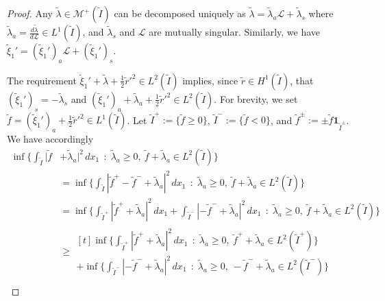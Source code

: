 \documentclass[a4, 11pt, reqno, final]{amsart}
\newcommand{\calL}{\mathcal{L}}
\newcommand{\calM}{\mathcal{M}}
\theoremstyle{plain}%
\DeclareMathOperator{\st}{\,:\,}
\begin{document}
	\begin{proof}
		Any $\widetilde{\lambda} \in \calM^+(\widetilde{I})$ can be decomposed uniquely as $\widetilde{\lambda} =  \widetilde{\lambda}_{a} \calL+ \widetilde{\lambda}_s$ where $\widetilde{\lambda}_{a} = \frac{d \widetilde{\lambda}}{d\calL}\in L^1(\widetilde{I})$, and $\widetilde{\lambda}_s$ and $\calL$ are mutually singular. Similarly, we have $\widetilde{\xi}_1' =  (\widetilde{\xi}_1')_a \calL+ (\widetilde{\xi}_1')_s$.

		The requirement $\widetilde{\xi}_1' + \widetilde{\lambda} + \frac12 \widetilde{r}'^2\in L^2(\widetilde{I})$ implies, since $\widetilde{r} \in H^1(\widetilde{I})$, that $(\widetilde{\xi}_1')_s = - \widetilde{\lambda}_s$ and
		$(\widetilde{\xi}_1')_a + \widetilde{\lambda}_a + \frac12 \widetilde{r}'^2\in L^2(\widetilde{I})$. For brevity, we set $\widetilde{f} = (\widetilde{\xi}_1')_a  + \frac12 \widetilde{r}'^2\in L^1(\widetilde{I})$. Let $\widetilde{I}^+:=\{\widetilde{f}\ge 0\}$, $\widetilde{I}^-:=\{\widetilde{f}< 0\} $, and $\widetilde{f}^\pm:=\pm \widetilde{f}\mathbf{1}_{\widetilde{I}^\pm}$.
		We have accordingly
		\begin{align}
			\inf\{\int_{\widetilde{I}} |\widetilde{f}  &+ \widetilde{\lambda}_{a}|^2 \, dx_1 \st \widetilde{\lambda}_{a} \geq 0, \  \widetilde{f}  + \widetilde{\lambda}_{a} \in L^2(\widetilde{I})\}\nonumber\\
			&=\inf\{\int_{\widetilde{I}} |\widetilde{f}^+ - \widetilde{f}^-  + \widetilde{\lambda}_{a}|^2 \, dx_1 \st \widetilde{\lambda}_{a} \geq 0, \  \widetilde{f}  + \widetilde{\lambda}_{a} \in L^2(\widetilde{I})\}\nonumber\\
			&=\inf\{\int_{\widetilde{I}^+} |\widetilde{f}^+ +\widetilde{\lambda}_{a}|^2 \, dx_1+\int_{\widetilde{I}^-} |-\widetilde{f}^-+ \widetilde{\lambda}_{a}|^2 \, dx_1 \st \widetilde{\lambda}_{a} \geq 0, \  \widetilde{f}  + \widetilde{\lambda}_{a} \in L^2(\widetilde{I})\}\nonumber\\
			&\geq\begin{multlined}[t]
				\inf\{\int_{\widetilde{I}^+} |\widetilde{f}^+ + \widetilde{\lambda}_{a}|^2  \, dx_1  \st \widetilde{\lambda}_{a} \geq 0, \  \widetilde{f}^+ + \widetilde{\lambda}_{a} \in L^2(\widetilde{I}^+)\}\\+\inf\{\int_{\widetilde{I}^-} |-\widetilde{f}^- +\widetilde{\lambda}_{a}|^2 \, dx_1  \st \widetilde{\lambda}_{a} \geq 0, \  -\widetilde{f}^-  + \widetilde{\lambda}_{a} \in L^2(\widetilde{I}^-)\}\end{multlined}\nonumber\\

\end{align}
\end{proof}
\end{document}
